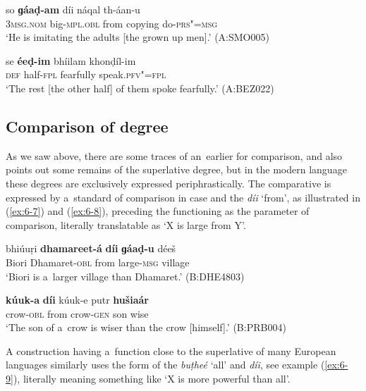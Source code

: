 \begin{exe}
\ex
\label{ex:6-5}
\gll so \textbf{ɡáaḍ-am} díi náqal th-áan-u \\
\textsc{3msg.nom} big-\textsc{mpl.obl} from copying do-\textsc{prs"=msg} \\
\glt `He is imitating the adults [the grown up men].' (A:SMO005)

\ex
\label{ex:6-6}
\gll se \textbf{éeḍ-im} bhíilam khonḍíl-im \\
\textsc{def} half-\textsc{fpl} fearfully speak.\textsc{pfv"=fpl} \\
\glt `The rest [the other half] of them spoke fearfully.' (A:BEZ022)
\end{exe}

\subsection{Comparison of degree}
\label{subsec:6-3-3}

As we saw above, there are some traces of an~earlier  for comparison, and \citet[17]{morgenstierne1941} also points out some remains of the \iliOIA superlative degree, but in the modern language these degrees are exclusively expressed periphrastically. The comparative is expressed by a~standard of comparison in  case and the  \textit{díi} `from', as illustrated in (\ref{ex:6-7}) and (\ref{ex:6-8}), preceding the  functioning as the parameter of comparison, literally translatable as `X is large from Y'. 

\begin{exe}
\ex
\label{ex:6-7}
\gll bhiúuṛi \textbf{dhamareet-á} \textbf{díi} \textbf{ɡáaḍ-u} déeš \\
Biori Dhamaret-\textsc{obl} from large-\textsc{msg} village \\
\glt `Biori is a~larger village than Dhamaret.' (B:DHE4803)

\ex
\label{ex:6-8}
\gll \textbf{kúuk-a} \textbf{díi} kúuk-e putr \textbf{hušiaár} \\
crow-\textsc{obl} from crow-\textsc{gen} son wise  \\
\glt `The son of a~crow is wiser than the crow [himself].' (B:PRB004)
\end{exe}

A construction having a~function close to the superlative of many European languages similarly uses the  form of the   \textit{buṭheé} `all' and \textit{díi}, see example (\ref{ex:6-9}), literally meaning something like `X is more powerful than all'.


